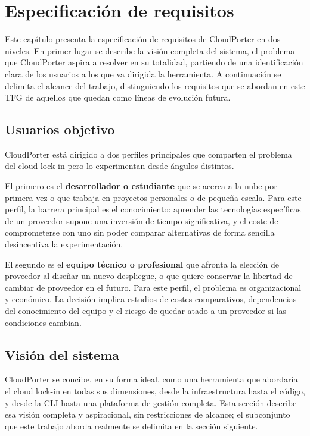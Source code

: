 \chapter{Especificación de requisitos}\label{cap:especificacion}

Este capítulo presenta la especificación de requisitos de CloudPorter en dos niveles.
En primer lugar se describe la visión completa del sistema, el problema que CloudPorter
aspira a resolver en su totalidad, partiendo de una identificación clara de los
usuarios a los que va dirigida la herramienta. A continuación se delimita el alcance
del trabajo, distinguiendo los requisitos que se abordan en este TFG de aquellos
que quedan como líneas de evolución futura.

\section{Usuarios objetivo}

CloudPorter está dirigido a dos perfiles principales que comparten el problema del
cloud lock-in pero lo experimentan desde ángulos distintos.

El primero es el \textbf{desarrollador o estudiante} que se acerca a la nube
por primera vez o que trabaja en proyectos personales o de pequeña escala. Para
este perfil, la barrera principal es el conocimiento: aprender las tecnologías
específicas de un proveedor supone una inversión de tiempo significativa, y el
coste de comprometerse con uno sin poder comparar alternativas de forma sencilla
desincentiva la experimentación.

El segundo es el \textbf{equipo técnico o profesional} que afronta la elección de
proveedor al diseñar un nuevo despliegue, o que quiere conservar la libertad de
cambiar de proveedor en el futuro. Para este perfil, el problema es organizacional
y económico. La decisión implica estudios de costes comparativos, dependencias del
conocimiento del equipo y el riesgo de quedar atado a un proveedor si las condiciones
cambian.

\section{Visión del sistema}

CloudPorter se concibe, en su forma ideal, como una herramienta que abordaría el
cloud lock-in en todas sus dimensiones, desde la infraestructura hasta el código, y
desde la CLI hasta una plataforma de gestión completa. Esta sección describe esa
visión completa y aspiracional, sin restricciones de alcance; el subconjunto que
este trabajo aborda realmente se delimita en la sección siguiente.

